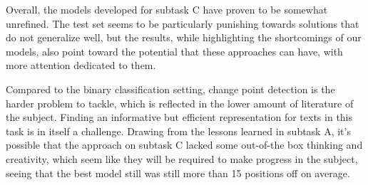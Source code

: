 Overall, the models developed for subtask C have proven to be somewhat unrefined.
The test set seems to be particularly punishing towards solutions that do not generalize well, but the results, while highlighting the shortcomings of our models, also point toward the potential that these approaches can have, with more attention dedicated to them.

Compared to the binary classification setting, change point detection is the harder problem to tackle, which is reflected in the lower amount of literature of the subject.
Finding an informative but efficient representation for texts in this task is in itself a challenge.
Drawing from the lessons learned in subtask A, it's possible that the approach on subtask C lacked some out-of-the box thinking and creativity, which seem like they will be required to make progress in the subject, seeing that the best model still was still more than 15 positions off on average.
